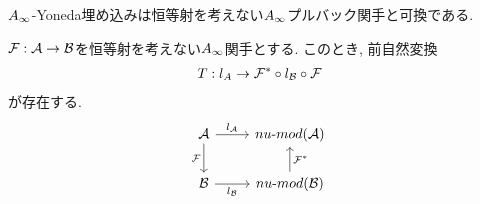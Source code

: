 \documentclass[uplatex, a4paper, 14Q, dvipdfmx]{jsarticle}
\begin{document}
$A_{\infty}$-Yoneda埋め込みは恒等射を考えない$A_{\infty}$プルバック関手と可換である. 

\begin{lemma}
  $\mathcal{F} : \mathcal{A} \to \mathcal{B}$を恒等射を考えない$A_{\infty}$関手とする. 
  このとき, 前自然変換
  \begin{align*}
    T : l_A \to \mathcal{F}^\ast \circ l_{\mathcal{B}} \circ \mathcal{F}
  \end{align*}
  が存在する.
  \[\begin{tikzcd}
    \A & {\numod{\A}} \\
    \B & {\numod{\B}}
    \arrow["{l_\A}", from=1-1, to=1-2]
    \arrow["{\F^\ast}"', from=2-2, to=1-2]
    \arrow["\F"', from=1-1, to=2-1]
    \arrow["{l_\B}"', from=2-1, to=2-2]
  \end{tikzcd}\]
\end{lemma}




\end{document}
